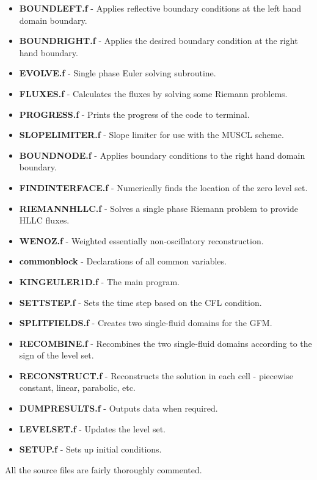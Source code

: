 \documentclass{article}
\begin{document}
\begin{itemize}
\item \textbf{BOUNDLEFT.f} - Applies reflective boundary conditions at the left hand domain boundary. 
\item \textbf{BOUNDRIGHT.f} - Applies the desired boundary condition at the right hand boundary.
\item \textbf{EVOLVE.f} - Single phase Euler solving subroutine.
\item \textbf{FLUXES.f} - Calculates the fluxes by solving some Riemann problems.
\item \textbf{PROGRESS.f} - Prints the progress of the code to terminal.
\item \textbf{SLOPELIMITER.f} - Slope limiter for use with the MUSCL scheme.
\item \textbf{BOUNDNODE.f} - Applies boundary conditions to the right hand domain boundary.
\item \textbf{FINDINTERFACE.f} - Numerically finds the location of the zero level set.
\item \textbf{RIEMANNHLLC.f} - Solves a single phase Riemann problem to provide HLLC fluxes.
\item \textbf{WENOZ.f} - Weighted essentially non-oscillatory reconstruction.
\item \textbf{commonblock} - Declarations of all common variables.
\item \textbf{KINGEULER1D.f} - The main program.
\item \textbf{SETTSTEP.f} - Sets the time step based on the CFL condition.
\item \textbf{SPLITFIELDS.f} - Creates two single-fluid domains for the GFM.
\item \textbf{RECOMBINE.f} - Recombines the two single-fluid domains according to the sign of the level set.
\item \textbf{RECONSTRUCT.f} - Reconstructs the solution in each cell - piecewise constant, linear, parabolic, etc.
\item \textbf{DUMPRESULTS.f} - Outputs data when required.
\item \textbf{LEVELSET.f} - Updates the level set.       
\item \textbf{SETUP.f} - Sets up initial conditions.
\end{itemize}

All the source files are fairly thoroughly commented.
\end{document}
